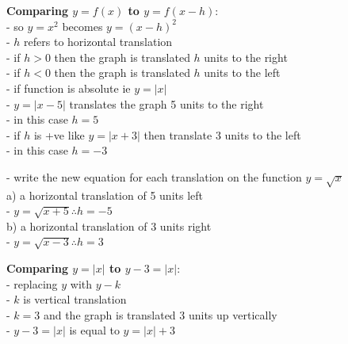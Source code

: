 \documentclass[10pt]{article}
\begin{document}

\textbf{Comparing \(y = f(x)\) to \(y = f(x-h)\)}: \\
- so \(y = x^2\) becomes \(y = (x - h)^2\) \\
- \(h\) refers to horizontal translation \\
- if \(h > 0\) then the graph is translated \(h\) units to the right \\
- if \(h < 0\) then the graph is translated \(h\) units to the left \\
- if function is absolute ie \(y = \left| x \right| \) \\
- \(y = \left| x - 5\right|\) translates the graph 5 units to the right \\
- in this case \(h = 5\) \\
- if \(h\) is +ve like \(y = \left| x + 3\right|\) then translate 3 units to the left \\
- in this case \(h = -3\)

- write the new equation for each translation on the function \(y = \sqrt{x}\) \\
a) a horizontal translation of 5 units left \\
- \(y = \sqrt{x+5} \therefore h = -5\) \\
b) a horizontal translation of 3 units right \\
- \(y = \sqrt{x - 3} \therefore h = 3\)


\textbf{Comparing \(y = \left|x\right|\) to \(y - 3 = \left|x\right|\)}: \\
- replacing \(y\) with \(y - k\) \\
- \(k\) is vertical translation \\
- \(k = 3\) and the graph is translated 3 units up vertically \\
- \(y - 3 = \left|x\right|\) is equal to \(y = \left|x\right| + 3\)
\end{document}
